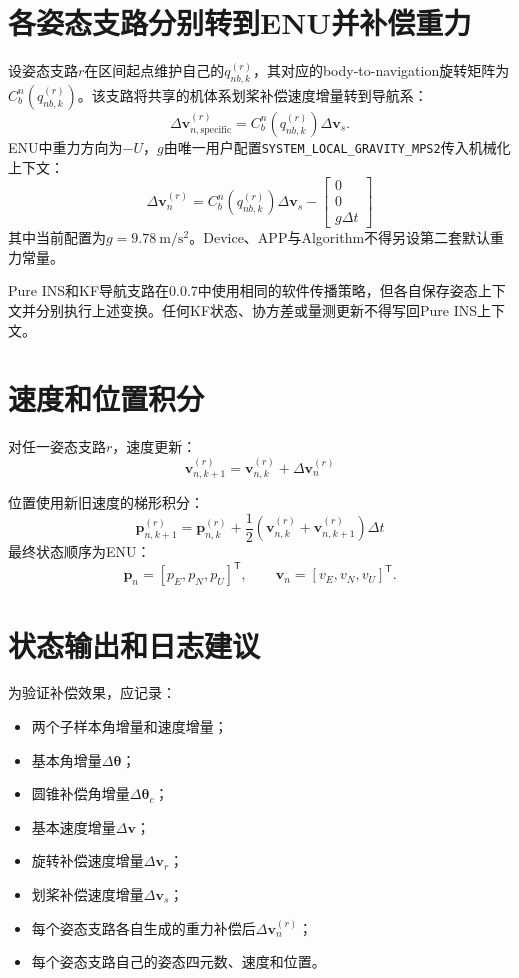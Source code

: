 \documentclass[12pt,a4paper]{ctexart}
\newcommand{\vect}[1]{\bm{#1}}
\begin{document}
\section{各姿态支路分别转到ENU并补偿重力}
设姿态支路$r$在区间起点维护自己的$q_{nb,k}^{(r)}$，其对应的body-to-navigation旋转矩阵为$C_b^n(q_{nb,k}^{(r)})$。该支路将共享的机体系划桨补偿速度增量转到导航系：
\[
\Delta\vect{v}_{n,\mathrm{specific}}^{(r)}
=C_b^n(q_{nb,k}^{(r)})\Delta\vect{v}_{s}.
\]
ENU中重力方向为$-U$，$g$由唯一用户配置\texttt{SYSTEM\_LOCAL\_GRAVITY\_MPS2}传入机械化上下文：
\[
\boxed{
\Delta\vect{v}_{n}^{(r)}
=
C_b^n(q_{nb,k}^{(r)})\Delta\vect{v}_{s}
-
\begin{bmatrix}0\\0\\g\Delta t\end{bmatrix}
}
\]
其中当前配置为$g=9.78\ \mathrm{m/s^2}$。Device、APP与Algorithm不得另设第二套默认重力常量。

Pure INS和KF导航支路在0.0.7中使用相同的软件传播策略，但各自保存姿态上下文并分别执行上述变换。任何KF状态、协方差或量测更新不得写回Pure INS上下文。

\section{速度和位置积分}
对任一姿态支路$r$，速度更新：
\[
\boxed{
\vect{v}_{n,k+1}^{(r)}=\vect{v}_{n,k}^{(r)}+\Delta\vect{v}_{n}^{(r)}
}
\]

位置使用新旧速度的梯形积分：
\[
\boxed{
\vect{p}_{n,k+1}^{(r)}
=
\vect{p}_{n,k}^{(r)}
+
\frac{1}{2}
\left(
\vect{v}_{n,k}^{(r)}+\vect{v}_{n,k+1}^{(r)}
\right)\Delta t
}
\]
最终状态顺序为ENU：
\[
\vect{p}_n=[p_E,p_N,p_U]^\mathsf{T},\qquad
\vect{v}_n=[v_E,v_N,v_U]^\mathsf{T}.
\]

\section{状态输出和日志建议}
为验证补偿效果，应记录：
\begin{itemize}[leftmargin=2em]
\item 两个子样本角增量和速度增量；
\item 基本角增量$\Delta\vect{\theta}$；
\item 圆锥补偿角增量$\Delta\vect{\theta}_c$；
\item 基本速度增量$\Delta\vect{v}$；
\item 旋转补偿速度增量$\Delta\vect{v}_r$；
\item 划桨补偿速度增量$\Delta\vect{v}_s$；
\item 每个姿态支路各自生成的重力补偿后$\Delta\vect{v}_n^{(r)}$；
\item 每个姿态支路自己的姿态四元数、速度和位置。
\end{itemize}
\end{document}
